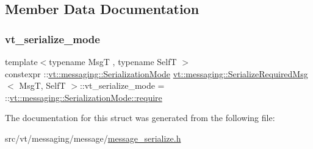 \subsection{Member Data Documentation}
\mbox{\label{structvt_1_1messaging_1_1_serialize_required_msg_ac3c448432ebe8ee3c2d454e2034bdd27}} 
\subsubsection{\texorpdfstring{vt\+\_\+serialize\+\_\+mode}{vt\_serialize\_mode}}
{\footnotesize\ttfamily template$<$typename MsgT , typename SelfT $>$ \\
constexpr \+::\hyperlink{namespacevt_1_1messaging_a436c5b9fc7f591e5978a136999cb9ef8}{vt\+::messaging\+::\+Serialization\+Mode} \hyperlink{structvt_1_1messaging_1_1_serialize_required_msg}{vt\+::messaging\+::\+Serialize\+Required\+Msg}$<$ MsgT, SelfT $>$\+::vt\+\_\+serialize\+\_\+mode = \+::\hyperlink{namespacevt_1_1messaging_a436c5b9fc7f591e5978a136999cb9ef8af0ffd3b7c2574ac324603ed00488c850}{vt\+::messaging\+::\+Serialization\+Mode\+::require}\hspace{0.3cm}{\ttfamily [static]}}



The documentation for this struct was generated from the following file\+:\begin{DoxyCompactItemize}
\item 
src/vt/messaging/message/\hyperlink{message__serialize_8h}{message\+\_\+serialize.\+h}\end{DoxyCompactItemize}
